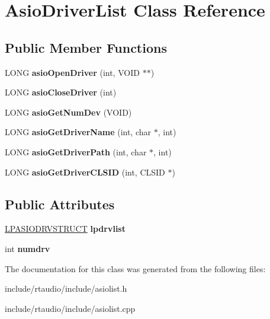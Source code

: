 \hypertarget{class_asio_driver_list}{}\section{Asio\+Driver\+List Class Reference}
\label{class_asio_driver_list}
\subsection*{Public Member Functions}
\begin{DoxyCompactItemize}
\item 
L\+O\+NG {\bfseries asio\+Open\+Driver} (int, V\+O\+ID $\ast$$\ast$)\hypertarget{class_asio_driver_list_a145d9fc7b65cc00da942541f9245fe4e}{}\label{class_asio_driver_list_a145d9fc7b65cc00da942541f9245fe4e}

\item 
L\+O\+NG {\bfseries asio\+Close\+Driver} (int)\hypertarget{class_asio_driver_list_a90d6236435b93ac85a96b1e2df46f533}{}\label{class_asio_driver_list_a90d6236435b93ac85a96b1e2df46f533}

\item 
L\+O\+NG {\bfseries asio\+Get\+Num\+Dev} (V\+O\+ID)\hypertarget{class_asio_driver_list_ad23930cbb95779e6648f5ab3e830b899}{}\label{class_asio_driver_list_ad23930cbb95779e6648f5ab3e830b899}

\item 
L\+O\+NG {\bfseries asio\+Get\+Driver\+Name} (int, char $\ast$, int)\hypertarget{class_asio_driver_list_a9b029ac1f04b71347beea39604985b55}{}\label{class_asio_driver_list_a9b029ac1f04b71347beea39604985b55}

\item 
L\+O\+NG {\bfseries asio\+Get\+Driver\+Path} (int, char $\ast$, int)\hypertarget{class_asio_driver_list_aa3ad9998006b612701b1cb4e1fd0a7c3}{}\label{class_asio_driver_list_aa3ad9998006b612701b1cb4e1fd0a7c3}

\item 
L\+O\+NG {\bfseries asio\+Get\+Driver\+C\+L\+S\+ID} (int, C\+L\+S\+ID $\ast$)\hypertarget{class_asio_driver_list_a971adb537edd83c9306d3d820c7c4460}{}\label{class_asio_driver_list_a971adb537edd83c9306d3d820c7c4460}

\end{DoxyCompactItemize}
\subsection*{Public Attributes}
\begin{DoxyCompactItemize}
\item 
\hyperlink{structasiodrvstruct}{L\+P\+A\+S\+I\+O\+D\+R\+V\+S\+T\+R\+U\+CT} {\bfseries lpdrvlist}\hypertarget{class_asio_driver_list_a50e0db83a50689461cd3ef09e5edca8f}{}\label{class_asio_driver_list_a50e0db83a50689461cd3ef09e5edca8f}

\item 
int {\bfseries numdrv}\hypertarget{class_asio_driver_list_a9a7d9874bd82e7f2e447a8579212dd1c}{}\label{class_asio_driver_list_a9a7d9874bd82e7f2e447a8579212dd1c}

\end{DoxyCompactItemize}


The documentation for this class was generated from the following files\+:\begin{DoxyCompactItemize}
\item 
include/rtaudio/include/asiolist.\+h\item 
include/rtaudio/include/asiolist.\+cpp\end{DoxyCompactItemize}
